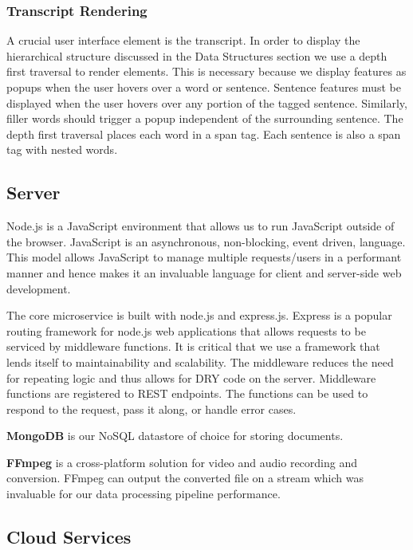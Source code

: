 \subsubsection*{Transcript Rendering}

A crucial user interface element is the transcript. In order to display the
hierarchical structure discussed in the Data Structures section we use a depth
first traversal to render elements. This is necessary because we display
features as popups when the user hovers over a word or sentence. Sentence
features must be displayed when the user hovers over any portion of the tagged
sentence. Similarly, filler words should trigger a popup independent of the
surrounding sentence. The depth first traversal places each word in a span tag.
Each sentence is also a span tag with nested words.

\subsection*{Server}

Node.js is a JavaScript environment that allows us to run JavaScript outside of
the browser. JavaScript is an asynchronous, non-blocking, event driven,
language. This model allows JavaScript to manage multiple requests/users in a
performant manner and hence makes it an invaluable language for client and
server-side web development.

The core microservice is built with node.js and express.js. Express is a popular
routing framework for node.js web applications that allows requests to be
serviced by middleware functions. It is critical that we use a framework that
lends itself to maintainability and scalability. The middleware reduces the need
for repeating logic and thus allows for DRY code on the server. Middleware
functions are registered to REST endpoints. The functions can be used to respond
to the request, pass it along, or handle error cases.

\textbf{MongoDB} is our NoSQL datastore of choice for storing documents.
 
\textbf{FFmpeg} is a cross-platform solution for video and audio recording and
conversion. FFmpeg can output the converted file on a stream which was
invaluable for our data processing pipeline performance.

\subsection*{Cloud Services}

